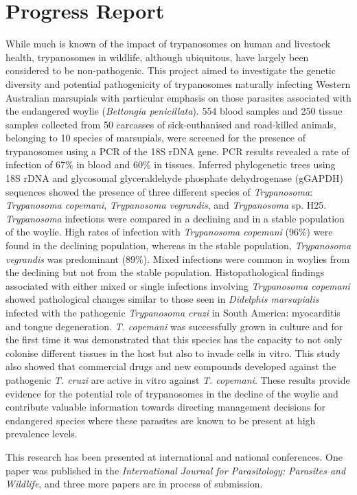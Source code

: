 \documentclass[version=last, paper=a4, DIV=18, usenames, dvipsnames]{scrartcl}
\begin{document}
%

%




\section*{Progress Report}
While much is known of the impact of trypanosomes on human and livestock
health, trypanosomes in wildlife, although ubiquitous, have largely been
considered to be non-pathogenic. This project aimed to investigate the
genetic diversity and potential pathogenicity of trypanosomes naturally
infecting Western Australian marsupials with particular emphasis on
those parasites associated with the endangered woylie (\emph{Bettongia
penicillata}). 554 blood samples and 250 tissue samples collected from
50 carcasses of sick-euthanised and road-killed animals, belonging to 10
species of marsupials, were screened for the presence of trypanosomes
using a PCR of the 18S rDNA gene. PCR results revealed a rate of
infection of 67\% in blood and 60\% in tissues. Inferred phylogenetic
trees using 18S rDNA and glycosomal glyceraldehyde phosphate
dehydrogenase (gGAPDH) sequences showed the presence of three different
species of \emph{Trypanosoma}: \emph{Trypanosoma copemani},
\emph{Trypanosoma vegrandis}, and \emph{Trypanosoma} sp. H25.
\emph{Trypanosoma} infections were compared in a declining and in a
stable population of the woylie. High rates of infection with
\emph{Trypanosoma copemani} (96\%) were found in the declining
population, whereas in the stable population, \emph{Trypanosoma
vegrandis} was predominant (89\%). Mixed infections were common in
woylies from the declining but not from the stable population.
Histopathological findings associated with either mixed or single
infections involving \emph{Trypanosoma copemani} showed pathological
changes similar to those seen in \emph{Didelphis marsupialis} infected
with the pathogenic \emph{Trypanosoma cruzi} in South America:
myocarditis and tongue degeneration. \emph{T. copemani} was successfully
grown in culture and for the first time it was demonstrated that this
species has the capacity to not only colonise different tissues in the
host but also to invade cells in vitro. This study also showed that
commercial drugs and new compounds developed against the pathogenic
\emph{T. cruzi} are active in vitro against \emph{T. copemani}. These
results provide evidence for the potential role of trypanosomes in the
decline of the woylie and contribute valuable information towards
directing management decisions for endangered species where these
parasites are known to be present at high prevalence levels.

This research has been presented at international and national
conferences. One paper was published in the \emph{International Journal
for Parasitology: Parasites and Wildlife}, and three more papers are in
process of submission.




\clearpage
\end{document}
